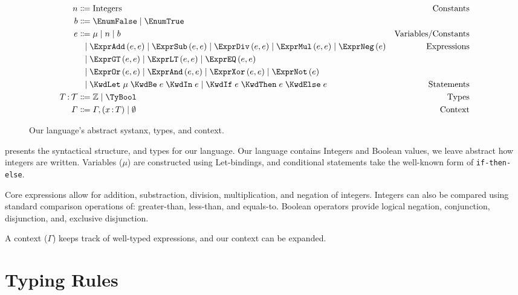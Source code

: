 \documentclass[10pt,a4paper,british,final]{article}
\begin{document}
\begin{figure}[ht]
  \centering
\begin{align*}
  n
  &
    \Coloneqq
    \text{Integers}
  & \text{Constants}
  \\
  b
  & \Coloneqq
    \EnumFalse \alt \EnumTrue
  \\
  e
  &
    \Coloneqq
    \mu
    \alt
    n
    \alt
    b
  & \text{Variables/Constants}
  \\
  & \firstAlt
    \exprAdd{e}{e}
    \alt
    \exprSub{e}{e}
    \alt
    \exprDiv{e}{e}
    \alt
    \exprMul{e}{e}
    \alt
    \exprNeg{e}
  & \text{Expressions}
  \\
  &
    \firstAlt
    \exprGT{e}{e}
    \alt
    \exprLT{e}{e}
    \alt
    \exprEQ{e}{e}
  &
  \\
  & \firstAlt
    \exprOr{e}{e}
    \alt
    \exprAnd{e}{e}
    \alt
    \exprXor{e}{e}
    \alt
    \exprNot{e}
  &
  \\
  &
    \firstAlt
    \stmtLet{\mu}{e}{e}
    \alt
    \stmtIf{e}{e}{e}
  &
    \text{Statements}
  \\
  \ty{T}{\mathcal{T}}
  &
    \Coloneqq
    \TyInt
    \alt
    \TyBool
  &
    \text{Types}
  \\
  \Gamma
  &
    \Coloneqq
    \envAdd{(\ty{x}{T})}
    \alt
    \emptyset
    &
      \text{Context}
\end{align*}
  \caption{\label{fig:syntax}Our language's abstract systanx, types, and context.}
\end{figure}

 presents the syntactical structure, and types for our language.
Our language contains Integers and Boolean values, we leave abstract how integers are written.
Variables ($\mu$) are constructed using Let-bindings, and conditional statements take the well-known form of \texttt{if-then-else}.

Core expressions allow for addition, substraction, division, multiplication, and negation of integers.
Integers can also be compared using standard comparison operations of: greater-than, less-than, and equals-to.
Boolean operators provide logical negation, conjunction, disjunction, and, exclusive disjunction.

A context ($\Gamma$) keeps track of well-typed expressions, and our context can be expanded.

\section{Typing Rules}\label{sec:typing-rules}
\end{document}
